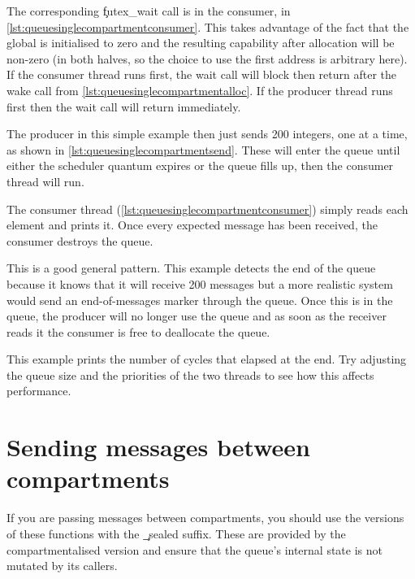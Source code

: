 \codelisting[filename=examples/producer_consumer/queue.cc,marker=allocate,label=lst:queuesinglecompartmentalloc,caption="Allocating a message queue for use in a single compartment"]{}

The corresponding \c{futex_wait} call is in the consumer, in \ref{lst:queuesinglecompartmentconsumer}.
This takes advantage of the fact that the global is initialised to zero and the resulting capability after allocation will be non-zero (in both halves, so the choice to use the first address is arbitrary here).
If the consumer thread runs first, the wait call will block then return after the wake call from \ref{lst:queuesinglecompartmentalloc}.
If the producer thread runs first then the wait call will return immediately.

The producer in this simple example then just sends 200 integers, one at a time, as shown in \ref{lst:queuesinglecompartmentsend}.
These will enter the queue until either the scheduler quantum expires or the queue fills up, then the consumer thread will run.

\codelisting[filename=examples/producer_consumer/queue.cc,marker=queue_send,label=lst:queuesinglecompartmentsend,caption="Sending messages to a message queue."]{}

The consumer thread (\ref{lst:queuesinglecompartmentconsumer}) simply reads each element and prints it.
Once every expected message has been received, the consumer destroys the queue.

This is a good general pattern.
This example detects the end of the queue because it knows that it will receive 200 messages but a more realistic system would send an end-of-messages marker through the queue.
Once this is in the queue, the producer will no longer use the queue and as soon as the receiver reads it the consumer is free to deallocate the queue.

\codelisting[filename=examples/producer_consumer/queue.cc,marker=consumer,label=lst:queuesinglecompartmentconsumer,caption="Receiving messages from a message queue."]{}

This example prints the number of cycles that elapsed at the end.
Try adjusting the queue size and the priorities of the two threads to see how this affects performance.

\section{Sending messages between compartments}

If you are passing messages between compartments, you should use the versions of these functions with the \c{_sealed} suffix.
These are provided by the compartmentalised version and ensure that the queue's internal state is not mutated by its callers.

